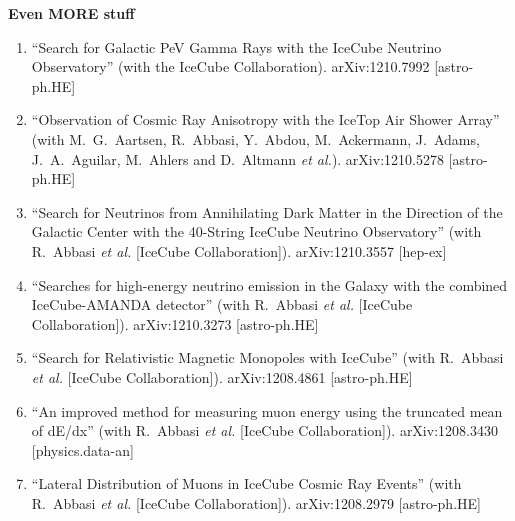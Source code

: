 {\bf Even MORE stuff}

\begin{enumerate}

\item ``Search for Galactic PeV Gamma Rays with the IceCube Neutrino
  Observatory'' (with the IceCube Collaboration). arXiv:1210.7992 [astro-ph.HE]
 


\item ``Observation of Cosmic Ray Anisotropy with the IceTop Air Shower
  Array'' (with M.~G.~Aartsen, R.~Abbasi, Y.~Abdou, M.~Ackermann,
  J.~Adams, J.~A.~Aguilar, M.~Ahlers and D.~Altmann {\it et al.}).
  arXiv:1210.5278 [astro-ph.HE]
  


\item ``Search for Neutrinos from Annihilating Dark Matter in the Direction
  of the Galactic Center with the 40-String IceCube Neutrino
  Observatory'' (with R.~Abbasi {\it et al.}  [IceCube Collaboration]). arXiv:1210.3557 [hep-ex]
  


\item ``Searches for high-energy neutrino emission in the Galaxy with the
  combined IceCube-AMANDA detector'' (with R.~Abbasi {\it et al.}
  [IceCube Collaboration]). arXiv:1210.3273 [astro-ph.HE]
  

\item ``Search for Relativistic Magnetic Monopoles with IceCube'' (with R.~Abbasi {\it et al.}  [IceCube Collaboration]). arXiv:1208.4861 [astro-ph.HE]
  


\item ``An improved method for measuring muon energy using the truncated
  mean of dE/dx'' (with R.~Abbasi {\it et al.}  [IceCube Collaboration]). arXiv:1208.3430 [physics.data-an]
  


\item ``Lateral Distribution of Muons in IceCube Cosmic Ray Events'' (with R.~Abbasi {\it et al.}  [IceCube Collaboration]). arXiv:1208.2979 [astro-ph.HE]
  

\end{enumerate}

